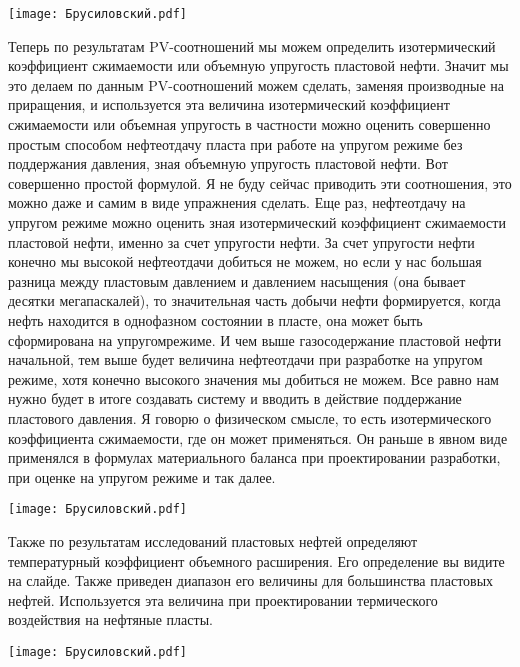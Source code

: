 \documentclass[main.tex]{subfiles}
\begin{document}
\begin{center}
\texttt{[image: Брусиловский.pdf]}
\end{center}

Теперь по результатам PV-соотношений мы можем определить изотермический коэффициент сжимаемости или объемную упругость пластовой нефти.
Значит мы это делаем по данным PV-соотношений можем сделать, заменяя производные на приращения, и используется эта величина изотермический коэффициент сжимаемости или объемная упругость в частности можно оценить совершенно простым способом нефтеотдачу пласта при работе на упругом режиме без поддержания давления, зная объемную упругость пластовой нефти.
Вот совершенно простой формулой.
Я не буду сейчас приводить эти соотношения, это можно даже и самим в виде упражнения сделать.
Еще раз, нефтеотдачу на упругом режиме можно оценить зная изотермический коэффициент сжимаемости пластовой нефти, именно за счет упругости нефти.
За счет упругости нефти конечно мы высокой нефтеотдачи добиться не можем, но если у нас большая разница между пластовым давлением и давлением насыщения (она бывает десятки мегапаскалей), то значительная часть добычи нефти формируется, когда нефть находится в однофазном состоянии
в пласте, она может быть сформирована на упругомрежиме.
И чем выше газосодержание пластовой нефти начальной, тем выше будет величина нефтеотдачи при разработке на упругом режиме, хотя конечно высокого значения мы добиться не можем.
Все равно нам нужно будет в итоге создавать систему и вводить в действие поддержание пластового давления.
Я говорю о физическом смысле, то есть изотермического коэффициента сжимаемости, где он может применяться.
Он раньше в явном виде применялся в формулах материального баланса при проектировании разработки, при оценке на упругом режиме и так далее.

\begin{center}
\texttt{[image: Брусиловский.pdf]}
\end{center}

Также по результатам исследований пластовых нефтей определяют температурный коэффициент объемного расширения.
Его определение вы видите на слайде.
Также приведен диапазон его величины для большинства пластовых нефтей.
Используется эта величина при проектировании термического воздействия на нефтяные пласты.

\begin{center}
\texttt{[image: Брусиловский.pdf]}
\end{center}
\end{document}
